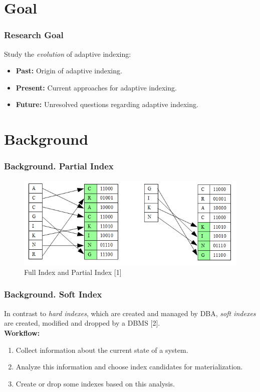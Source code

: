 \documentclass{beamer}
\begin{document}
\section{Goal}
\begin{frame}
\frametitle{Research Goal}
\pause
Study the \emph{evolution} of adaptive indexing: \pause
\begin{itemize}
\item{\textbf{Past:}} Origin of adaptive indexing. \pause
\item{\textbf{Present:}} Current approaches for adaptive indexing. \pause
\item{\textbf{Future:}} Unresolved questions regarding adaptive indexing.
\end{itemize}
\end{frame}

\section{Background}
\begin{frame}
\frametitle{Background. Partial Index}
\begin{figure}
\centering
\includegraphics[width=\textwidth]{graphics/partial.png}
\caption{Full Index and Partial Index [1]}
\end{figure}
\end{frame}

\begin{frame}
\frametitle{Background. Soft Index}
In contrast to \emph{hard indexes}, which are created and managed by DBA, \emph{soft indexes} are created, modified and dropped by a DBMS [2].\\ \pause
\vspace{0.5cm}\textbf{Workflow:} \pause
\begin{enumerate}
\item{Collect information about the current state of a system.} \pause
\item{Analyze this information and choose index candidates for  materialization.} \pause
\item{Create or drop some indexes based on this analysis.}
\end{enumerate}
\end{frame}
\end{document}
